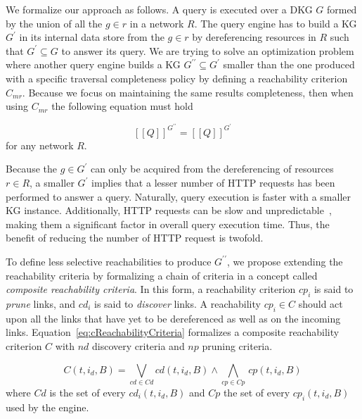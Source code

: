 We formalize our approach as follows.
A query is executed over a DKG $G$ formed by the union of all the $g \in r$ in a network $R$.
The query engine has to build a KG $G^{\prime}$ in its internal data store from the  $g \in r$ by dereferencing resources in $R$ such that
$G^{\prime} \subseteq G$ to answer its query.
We are trying to solve an optimization problem where another query engine builds a KG
$G^{\prime\prime} \subseteq G^{\prime}$
smaller than the one produced with a specific traversal completeness policy
by defining a reachability criterion $C_{mr}$.
Because we focus on maintaining the same results completeness, then when using $C_{mr}$ the following equation must hold

\begin{equation}\label{eq:evalQueryStructuralAssumption}
   [\![ Q ]\!]^{G^{\prime\prime}} = [\![ Q ]\!]^{G^{\prime}}
\end{equation}
for any network $R$.

Because the $g \in G^{\prime}$ can only be acquired from the dereferencing of resources $r \in R$, a smaller $G^\prime$ implies that a lesser number of HTTP requests has been performed to answer a query.
Naturally, query execution is faster with a smaller KG instance.
Additionally, HTTP requests can be slow and unpredictable~\cite{hartig2016walking}, making them a significant factor in overall query execution time. 
Thus, the benefit of reducing the number of HTTP request is twofold.

To define less selective reachabilities to produce $G^{\prime\prime}$, we propose extending the reachability criteria by formalizing a chain of criteria in a concept called \emph{composite reachability criteria}.
In this form, a reachability criterion $cp_i$ is said to \emph{prune} links, and $cd_i$ is said to \emph{discover} links.
A reachability $cp_i \in C$ should act upon all the links that have yet to be dereferenced as well as on the incoming links.
Equation~\ref{eq:cReachabilityCriteria} formalizes a composite reachability criterion $C$ with $nd$ discovery criteria and $np$ pruning criteria.

\begin{equation}\label{eq:cReachabilityCriteria}
   C(t, i_d, B) = \bigvee_{cd \in Cd} cd(t, i_d, B) \mathrel{\land} \bigwedge_{cp \in Cp} \, cp(t, i_d, B)
\end{equation}
where $Cd$ is the set of every $cd_i(t, i_d, B)$ and $Cp$ the set of every $cp_i(t, i_d, B)$ used by the engine.
\iffalse
Maybe refer to the link queue here in a footnote.
\fi

